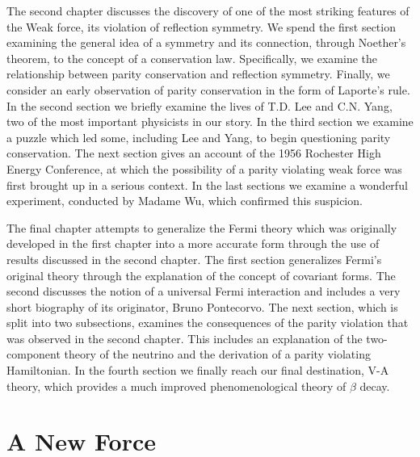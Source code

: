 \documentclass[a4paper,12pt]{book}
\begin{document}
The second chapter discusses the discovery of one of the most striking features of the Weak force, its violation of reflection symmetry. We spend the first section examining the general idea of a symmetry and its connection, through Noether's theorem, to the concept of a conservation law. Specifically, we examine the relationship between parity conservation and reflection symmetry. Finally, we consider an early observation of parity conservation in the form of Laporte's rule. In the second section we briefly examine the lives of T.D. Lee and C.N. Yang, two of the most important physicists in our story. In the third section we examine a puzzle which led some, including Lee and Yang, to begin questioning parity conservation. The next section gives an account of the 1956 Rochester High Energy Conference, at which the possibility of a parity violating weak force was first brought up in a serious context. In the last sections we examine a wonderful experiment, conducted by Madame Wu, which confirmed this suspicion.

The final chapter attempts to generalize the Fermi theory which was originally developed in the first chapter into a more accurate form through the use of results discussed in the second chapter. The first section generalizes Fermi's original theory through the explanation of the concept of covariant forms. The second discusses the notion of a universal Fermi interaction and includes a very short biography of its originator, Bruno Pontecorvo. The next section, which is split into two subsections, examines the consequences of the parity violation that was observed in the second chapter. This includes an explanation of the two-component theory of the neutrino and the derivation of a parity violating Hamiltonian. In the fourth section we finally reach our final destination, V-A theory, which provides a much improved phenomenological theory of $\beta$ decay. 




\chapter{A New Force}
\end{document}
